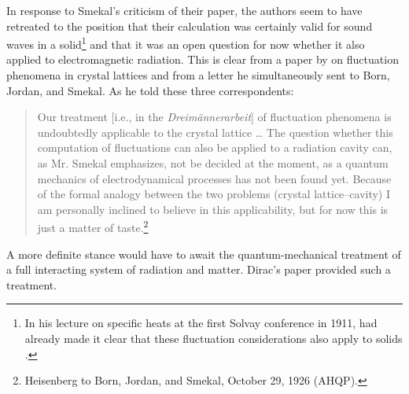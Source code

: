 \documentclass[12pt]{elsart}
\begin{document}
In response to Smekal's criticism of their paper, the authors seem to have retreated to the position that their calculation was certainly valid for sound waves in a solid\footnote{In his lecture on specific heats at the first Solvay conference in 1911, \citet[p.\ 342]{Einstein 1914} had already made it clear that these fluctuation considerations also apply to solids \citep[p.\ 180]{Bach 1989}.} and that it was an open question for now whether it also applied to electromagnetic radiation. This is clear from a paper by \citet[p.\ 501, note 2]{Heisenberg 1926b} on fluctuation phenomena in crystal lattices and from a letter he simultaneously sent to Born, Jordan, and Smekal. As he told these three correspondents:
\begin{quotation}
Our treatment [i.e., in the {\it Dreim\"annerarbeit}] of fluctuation phenomena is undoubtedly applicable to the crystal lattice \ldots 
The question whether this computation of fluctuations can also be applied to a radiation cavity can, as Mr. Smekal emphasizes, not be decided at the moment, as a quantum mechanics of electrodynamical processes has not been found yet. Because of the formal analogy between the two problems (crystal lattice--cavity) I am personally inclined to believe in this applicability, but for now this is just a matter of taste.\footnote{Heisenberg to Born, Jordan, and Smekal, October 29, 1926 (AHQP).} 
\end{quotation}
A more definite stance would have to await the quantum-mechanical treatment of a full interacting system of radiation and matter. Dirac's paper provided such a treatment.
\end{document}
